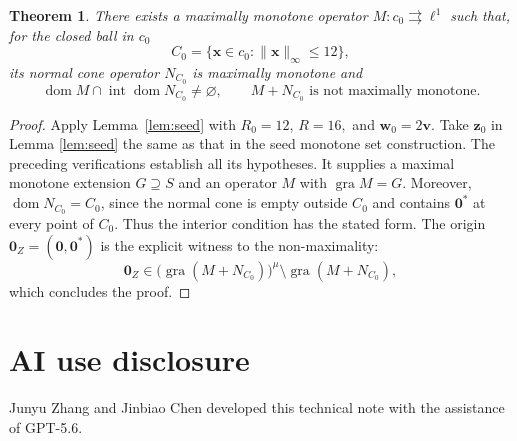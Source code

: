 \documentclass[11pt,a4paper]{article}
\theoremstyle{reportstyle}
\newtheorem{theorem}[lemma]{Theorem}
\numberwithin{equation}{section}
\DeclareMathOperator{\gra}{gra}
\DeclareMathOperator{\dom}{dom}
\DeclareMathOperator{\Int}{int}
\newcommand{\bx}{\mathbf x}
\newcommand{\bv}{\mathbf v}
\newcommand{\bz}{\mathbf z}
\newcommand{\bw}{\mathbf w}
\newcommand{\bzero}{\mathbf 0}
\begin{document}
	\begin{theorem}
		\label{thm:main}
		There exists a maximally monotone operator
		$M:c_0\rightrightarrows\ell^1$ such that, for the closed ball in $c_0$
		$$C_0=\{\bx\in c_0: \|\bx\|_\infty\leq 12\},$$
		its normal cone operator $N_{C_0}$ is maximally monotone and
		\begin{equation*}
			\dom M\cap\Int\dom N_{C_0} \ne\varnothing, \qquad M+N_{C_0} \text{ is not maximally monotone}.
		\end{equation*}
	\end{theorem}

	\begin{proof}[Proof]
		Apply Lemma~\ref{lem:seed} with $R_0=12$, $R=16,$ and $\bw_0=2\bv$. Take $\bz_0$ in Lemma \ref{lem:seed} the same as that in the seed monotone set construction. The preceding verifications establish all its hypotheses. It supplies a maximal monotone extension $G\supseteq S$ and an operator $M$ with $\gra M=G$. Moreover, $\dom N_{C_0}=C_0$, since the normal cone is empty
		outside $C_0$ and contains $\bzero^*$ at every point of $C_0$. Thus the interior condition has the stated form. The origin $\bzero_Z = (\bzero,\bzero^*)$ is the explicit witness to the non-maximality:
		$$\bzero_Z \in \bigl(\gra(M+N_{C_0})\bigr)^\mu \setminus \gra(M+N_{C_0}),$$
		which concludes the proof.
	\end{proof}

	\section*{AI use disclosure}
	Junyu Zhang and Jinbiao Chen developed this technical note with the
	assistance of GPT-5.6.

	
	
\end{document}

